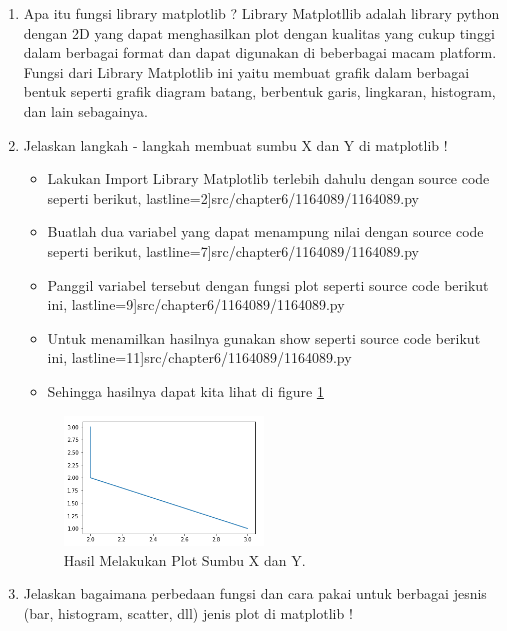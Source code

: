 \begin{enumerate}

\item Apa itu fungsi library matplotlib ?
	\subitem Library Matplotllib adalah library python dengan 2D yang dapat menghasilkan plot dengan kualitas yang cukup tinggi dalam berbagai format dan dapat digunakan di beberbagai macam platform. Fungsi dari Library Matplotlib ini yaitu membuat grafik dalam berbagai bentuk seperti grafik diagram batang, berbentuk garis, lingkaran, histogram, dan lain sebagainya.

\item Jelaskan langkah - langkah membuat sumbu X dan Y di matplotlib !

	\begin{itemize}
		\item Lakukan Import Library Matplotlib terlebih dahulu dengan source code seperti berikut,
			 lastline=2]{src/chapter6/1164089/1164089.py}
		\item Buatlah dua variabel yang dapat menampung nilai dengan source code seperti berikut,
			 lastline=7]{src/chapter6/1164089/1164089.py}
		\item Panggil variabel tersebut dengan fungsi plot seperti source code berikut ini,
			 lastline=9]{src/chapter6/1164089/1164089.py}
		\item Untuk menamilkan hasilnya gunakan show seperti source code berikut ini,
			 lastline=11]{src/chapter6/1164089/1164089.py}
		\item Sehingga hasilnya dapat kita lihat di figure \ref{YNC6-1}
	\end{itemize}

	\begin{figure}[!htbp!]
		\centerline{\includegraphics[width=0.5\textwidth]{figures/chapter6/1164089/YNC6-1.png}}
		\caption{Hasil Melakukan Plot Sumbu X dan Y.}
		\label{YNC6-1}
	\end{figure}

\item Jelaskan bagaimana perbedaan fungsi dan cara pakai untuk berbagai jesnis (bar, histogram, scatter, dll) jenis plot di matplotlib !


\end{enumerate}
